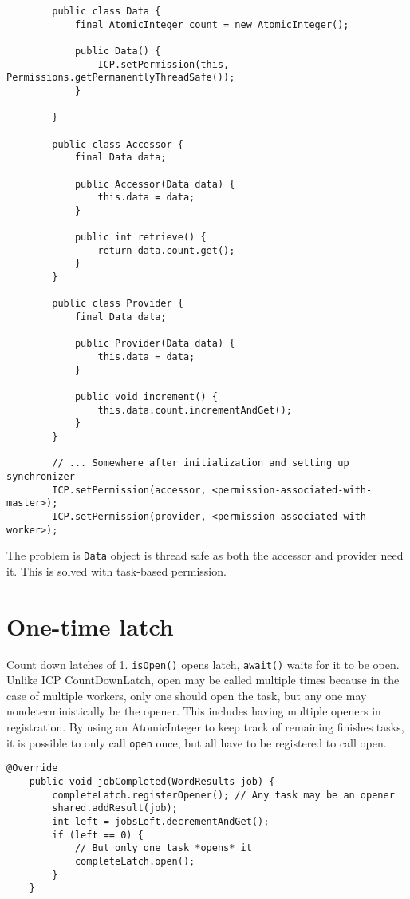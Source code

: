 \documentclass[11pt]{article}
\begin{document}
    \begin{lstlisting}
        public class Data {
            final AtomicInteger count = new AtomicInteger();

            public Data() {
                ICP.setPermission(this, Permissions.getPermanentlyThreadSafe());
            }

        }

        public class Accessor {
            final Data data;

            public Accessor(Data data) {
                this.data = data;
            }

            public int retrieve() {
                return data.count.get();
            }
        }

        public class Provider {
            final Data data;

            public Provider(Data data) {
                this.data = data;
            }

            public void increment() {
                this.data.count.incrementAndGet();
            }
        }

        // ... Somewhere after initialization and setting up synchronizer
        ICP.setPermission(accessor, <permission-associated-with-master>);
        ICP.setPermission(provider, <permission-associated-with-worker>);
    \end{lstlisting}

    The problem is \lstinline{Data} object is thread safe as both the accessor and provider need it.
    This is solved with task-based permission.

    \section{One-time latch}
    Count down latches of 1. \lstinline{isOpen()} opens latch, \lstinline{await()} waits for it to
    be open. Unlike ICP CountDownLatch, open may be called multiple times because in the case of multiple
    workers, only one should open the task, but any one may nondeterministically be the opener. This includes
    having multiple openers in registration. By using an AtomicInteger to keep track of remaining finishes tasks,
    it is possible to only call \lstinline{open} once, but all have to be registered to call open.

    \begin{lstlisting}[caption=Multiple openers, label=lst:multOpeners]
    @Override
    public void jobCompleted(WordResults job) {
        completeLatch.registerOpener(); // Any task may be an opener
        shared.addResult(job);
        int left = jobsLeft.decrementAndGet();
        if (left == 0) {
            // But only one task *opens* it
            completeLatch.open();
        }
    }
    \end{lstlisting}
\end{document}
